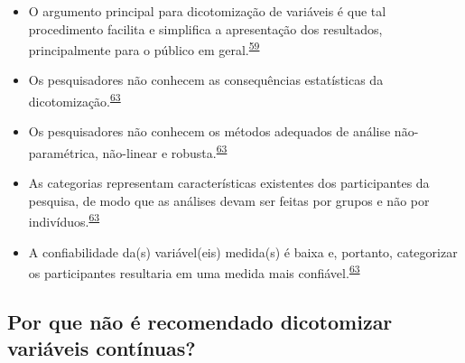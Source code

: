\documentclass[
  a4paper,
]{book}
\begin{document}
\begin{itemize}
\item
  O argumento principal para dicotomização de variáveis é que tal procedimento facilita e simplifica a apresentação dos resultados, principalmente para o público em geral.\textsuperscript{\protect\hyperlink{ref-Fedorov2009}{59}}
\item
  Os pesquisadores não conhecem as consequências estatísticas da dicotomização.\textsuperscript{\protect\hyperlink{ref-MacCallum2002}{63}}
\item
  Os pesquisadores não conhecem os métodos adequados de análise não-paramétrica, não-linear e robusta.\textsuperscript{\protect\hyperlink{ref-MacCallum2002}{63}}
\item
  As categorias representam características existentes dos participantes da pesquisa, de modo que as análises devam ser feitas por grupos e não por indivíduos.\textsuperscript{\protect\hyperlink{ref-MacCallum2002}{63}}
\item
  A confiabilidade da(s) variável(eis) medida(s) é baixa e, portanto, categorizar os participantes resultaria em uma medida mais confiável.\textsuperscript{\protect\hyperlink{ref-MacCallum2002}{63}}
\end{itemize}

\hypertarget{por-que-nuxe3o-uxe9-recomendado-dicotomizar-variuxe1veis-contuxednuas}{%
\subsection{Por que não é recomendado dicotomizar variáveis contínuas?}\label{por-que-nuxe3o-uxe9-recomendado-dicotomizar-variuxe1veis-contuxednuas}}
\end{document}

